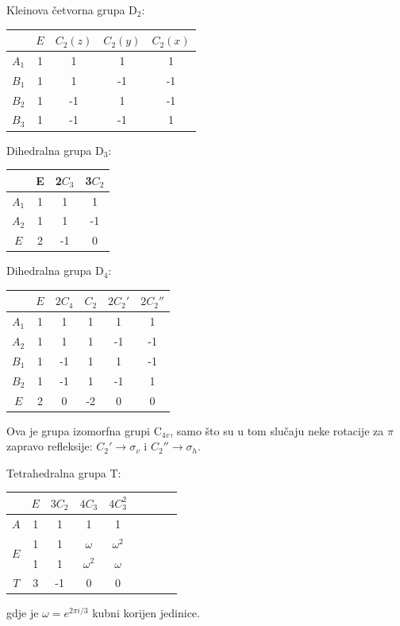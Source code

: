 Kleinova četvorna grupa D$_2$: 
\begin{center}
\begin{tabular}{c|cccc}
     & $E$ & $C_{2}(z)$ & $C_{2}(y)$ & $C_{2}(x)$ \\ \hline
    $A_1$ & 1 & 1 & 1 & 1 \\
    $B_1$ & 1 & 1 & -1 & -1 \\
    $B_2$ & 1 & -1 & 1 & -1 \\
    $B_3$ & 1 & -1 & -1 & 1 \\
\end{tabular}
\end{center}

Dihedralna grupa D$_3$: 
\begin{center}
\begin{tabular}{c|ccc}
  & E & 2$C_3$  & 3$C_2$ \\ \hline
$A_1$ & 1 & 1& 1 \\
$A_2$ & 1 & 1&-1 \\
 $E$  & 2 &-1& 0
\end{tabular}
\end{center}


Dihedralna grupa D$_{4}$: 
\begin{center}
    \begin{tabular}{c|ccccc}
         & $E$ & $2C_4$ & $C_2$ & $2C_{2}'$ & $2C_{2}''$ \\ \hline
        $A_1$ & 1 & 1 & 1 & 1 & 1 \\
        $A_2$ & 1 & 1 & 1 & -1 & -1 \\
        $B_1$ & 1 & -1 & 1 & 1 & -1 \\
        $B_2$ & 1 & -1 & 1 & -1 & 1 \\
        $E$ & 2 & 0 & -2 & 0 & 0 \\
    \end{tabular}
\end{center}
Ova je grupa izomorfna grupi C$_{4v}$, samo što su u tom  slučaju
neke rotacije za $\pi$ zapravo refleksije: $C_{2}' \to \sigma_v$ i
$C_{2}'' \to \sigma_h$.


Tetrahedralna grupa T:  
\begin{center}
\begin{tabular}{c|cccccccc}
 & $E$ & $3C_2$ & $4C_3$ & $4C_{3}^2$  \\ \hline
$A$ & 1 & 1 & 1 & 1  \\
\multirow{2}{*}{$E$} & 1 & 1 & $\omega$ & $\omega^2$ \\
 & 1 & 1 & $\omega^2$ & $\omega$  \\
$T$ & 3 & -1 & 0 & 0  \\
\end{tabular}
\end{center}
gdje je $\omega = e^{2\pi i/3}$ kubni korijen jedinice.

